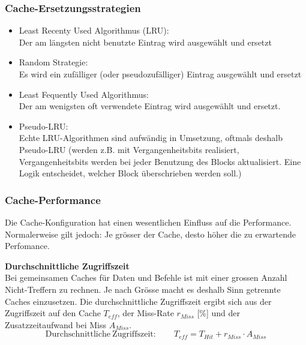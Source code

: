 
\subsubsection{Cache-Ersetzungsstrategien}
	\begin{itemize}[noitemsep,topsep=0pt]
		\item Least Recenty Used Algorithmus (LRU):\\
		Der am längsten nicht benutzte Eintrag wird ausgewählt und ersetzt
		\item Random Strategie:\\
		Es wird ein zufälliger (oder pseudozufälliger) Eintrag ausgewählt und ersetzt
		\item Least Fequently Used Algorithmus:\\
		Der am wenigsten oft verwendete Eintrag wird ausgewählt und ersetzt.
		\item Pseudo-LRU:\\
		Echte LRU-Algorithmen sind aufwändig in Umsetzung, oftmals deshalb Pseudo-LRU (werden z.B. mit Vergangenheitsbits realisiert, Vergangenheitsbits werden bei jeder Benutzung des Blocks aktualisiert.
		Eine Logik entscheidet, welcher Block überschrieben werden soll.)
	\end{itemize}
	
    \clearpage
	\subsubsection{Cache-Performance}
Die Cache-Konfiguration hat einen wesentlichen Einfluss auf die Performance.
Normalerweise gilt jedoch: Je grösser der Cache, desto höher die zu erwartende Perfomance.

\textbf{Durchschnittliche Zugriffszeit}\\
Bei gemeinsamen Caches für Daten und Befehle ist mit einer grossen Anzahl Nicht-Treffern zu rechnen.
Je nach Grösse macht es deshalb Sinn getrennte Caches einzusetzen. Die durchschnittliche Zugriffszeit ergibt sich aus der Zugriffszeit auf den Cache $T_{eff}$, der Miss-Rate $r_{Miss}$ [\%] und der Zusatzzeitaufwand bei Miss $A_{Miss}$.
\begin{equation*}
	\mathrm{Durchschnittliche \ Zugriffszeit:} \qquad T_{eff} = T_{Hit} + r_{Miss} \cdot A_{Miss}
\end{equation*}

